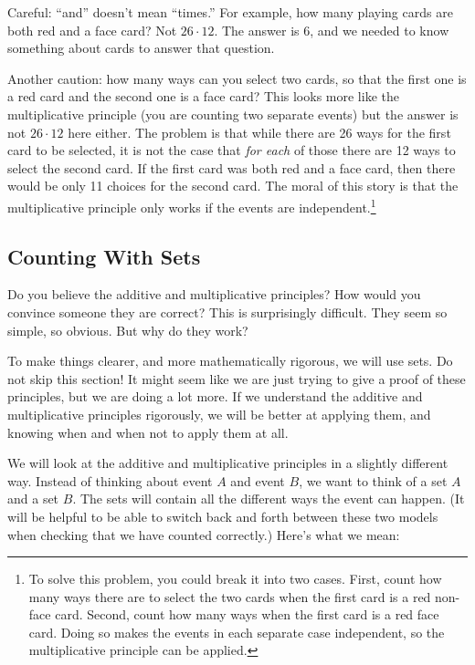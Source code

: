 \documentclass[12pt]{article}
\begin{document}
 Careful: ``and'' doesn't mean ``times.''  For example, how many playing cards are both red and a face card?  Not $26 \cdot 12$.  The answer is 6, and we needed to know something about cards to answer that question.

 Another caution: how many ways can you select two cards, so that the first one is a red card and the second one is a face card?  This looks more like the multiplicative principle (you are counting two separate events) but the answer is not $26 \cdot 12$ here either.  The problem is that while there are 26 ways for the first card to be selected, it is not the case that {\em for each} of those there are 12 ways to select the second card.  If the first card was both red and a face card, then there would be only 11 choices for the second card.  The moral of this story is that the multiplicative principle only works if the events are independent.\footnote{To solve this problem, you could break it into two cases. First, count how many ways there are to select the two cards when the first card is a red non-face card. Second, count how many ways when the first card is a red face card.  Doing so makes the events in each separate case independent, so the multiplicative principle can be applied.}

\subsection{Counting With Sets}


Do you believe the additive and multiplicative principles?  How would you convince someone they are correct?  This is surprisingly difficult.  They seem so simple, so obvious.  But why do they work?

To make things clearer, and more mathematically rigorous, we will use sets.  Do not skip this section!  It might seem like we are just trying to give a proof of these principles, but we are doing a lot more.  If we understand the additive and multiplicative principles rigorously, we will be better at applying them, and knowing when and when not to apply them at all.

We will look at the additive and multiplicative principles in a slightly different way.  Instead of thinking about event $A$ and event $B$, we want to think of a set $A$ and a set $B$.  The sets will contain all the different ways the event can happen.  (It will be helpful to be able to switch back and forth between these two models when checking that we have counted correctly.)  Here's what we mean:
\end{document}
